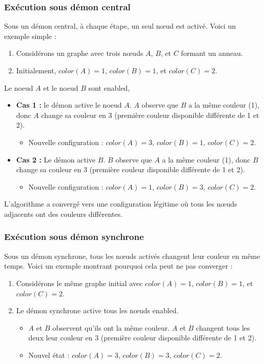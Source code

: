 \documentclass[11pt]{article}
\begin{document}
\subsubsection{Exécution sous démon central}
\label{sec:orga36fd39}
Sous un démon central, à chaque étape, un seul nœud est activé. Voici un exemple simple :

\begin{enumerate}
\item Considérons un graphe avec trois nœuds \(A\), \(B\), et \(C\) formant un anneau.
\item Initialement, \(color(A) = 1\), \(color(B) = 1\), et \(color(C) = 2\).
\end{enumerate}

Le noeud \(A\) et le noeud \(B\) sont enabled, 

\begin{itemize}
\item \textbf{\textbf{Cas 1 :}} le démon active le noeud \(A\). \(A\) observe que \(B\) a la même couleur (1), donc \(A\) change sa couleur en 3 (première couleur disponible différente de 1 et 2).
\begin{itemize}
\item Nouvelle configuration : \(color(A) = 3\), \(color(B) = 1\), \(color(C) = 2\).
\end{itemize}
\item \textbf{\textbf{Cas 2 :}} Le démon active \(B\). \(B\) observe que \(A\) a la même couleur (1), donc \(B\) change sa couleur en 3 (première couleur disponible différente de 1 et 2).
\begin{itemize}
\item Nouvelle configuration : \(color(A) = 1\), \(color(B) = 3\), \(color(C) = 2\).
\end{itemize}
\end{itemize}

L'algorithme a convergé vers une configuration légitime où tous les nœuds adjacents ont des couleurs différentes.

\subsubsection{Exécution sous démon synchrone}
\label{sec:org256f1b0}
Sous un démon synchrone, tous les nœuds activés changent leur couleur en même temps. Voici un exemple montrant pourquoi cela peut ne pas converger :

\begin{enumerate}
\item Considérons le même graphe initial avec \(color(A) = 1\), \(color(B) = 1\), et \(color(C) = 2\).

\item Le démon synchrone active tous les nœuds enabled.
\begin{itemize}
\item \(A\) et \(B\) observent qu'ils ont la même couleur. \(A\) et \(B\) changent tous les deux leur couleur en 3 (première couleur disponible différente de 1 et 2).
\item Nouvel état : \(color(A) = 3\), \(color(B) = 3\), \(color(C) = 2\).
\end{itemize}
\end{enumerate}
\end{document}
